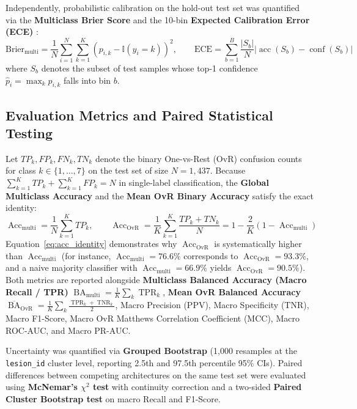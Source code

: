\documentclass[11pt,a4paper]{article}
\begin{document}
Independently, probabilistic calibration on the hold-out test set was quantified via the \textbf{Multiclass Brier Score} \cite{brier1950} and the 10-bin \textbf{Expected Calibration Error (ECE)} \cite{guo2017}:
\begin{equation}
    \text{Brier}_{\text{multi}} = \frac{1}{N} \sum_{i=1}^{N} \sum_{k=1}^{K} \left(p_{i,k} - \mathbb{I}(y_i = k)\right)^2, \qquad
    \text{ECE} = \sum_{b=1}^{B} \frac{|S_b|}{N} \left| \operatorname{acc}(S_b) - \operatorname{conf}(S_b) \right|
\end{equation}
where $S_b$ denotes the subset of test samples whose top-1 confidence $\hat{p}_i = \max_k p_{i,k}$ falls into bin $b$.

\subsection{Evaluation Metrics and Paired Statistical Testing}
Let $TP_k, FP_k, FN_k, TN_k$ denote the binary One-vs-Rest (OvR) confusion counts for class $k \in \{1, \dots, 7\}$ on the test set of size $N = 1,437$. Because $\sum_{k=1}^K TP_k + \sum_{k=1}^K FP_k = N$ in single-label classification, the \textbf{Global Multiclass Accuracy} and the \textbf{Mean OvR Binary Accuracy} satisfy the exact identity:
\begin{equation}
    \operatorname{Acc}_{\text{multi}} = \frac{1}{N}\sum_{k=1}^{K} TP_k, \qquad
    \operatorname{Acc}_{\text{OvR}} = \frac{1}{K}\sum_{k=1}^{K} \frac{TP_k + TN_k}{N} = 1 - \frac{2}{K}\left(1 - \operatorname{Acc}_{\text{multi}}\right)
    \label{eq:acc_identity}
\end{equation}
Equation~\eqref{eq:acc_identity} demonstrates why $\operatorname{Acc}_{\text{OvR}}$ is systematically higher than $\operatorname{Acc}_{\text{multi}}$ (for instance, $\operatorname{Acc}_{\text{multi}} = 76.6\%$ corresponds to $\operatorname{Acc}_{\text{OvR}} = 93.3\%$, and a naive majority classifier with $\operatorname{Acc}_{\text{multi}} = 66.9\%$ yields $\operatorname{Acc}_{\text{OvR}} = 90.5\%$). Both metrics are reported alongside \textbf{Multiclass Balanced Accuracy (Macro Recall / TPR)} $\operatorname{BA}_{\text{multi}} = \frac{1}{K}\sum_k \operatorname{TPR}_k$, \textbf{Mean OvR Balanced Accuracy} $\overline{\operatorname{BA}}_{\text{OvR}} = \frac{1}{K}\sum_k \frac{\operatorname{TPR}_k + \operatorname{TNR}_k}{2}$, Macro Precision (PPV), Macro Specificity (TNR), Macro F1-Score, Macro OvR Matthews Correlation Coefficient (MCC), Macro ROC-AUC, and Macro PR-AUC.

Uncertainty was quantified via \textbf{Grouped Bootstrap} (1,000 resamples at the \texttt{lesion\_id} cluster level, reporting 2.5th and 97.5th percentile 95\% CIs). Paired differences between competing architectures on the same test set were evaluated using \textbf{McNemar's $\chi^2$ test} with continuity correction and a two-sided \textbf{Paired Cluster Bootstrap test} on macro Recall and F1-Score.
\end{document}
